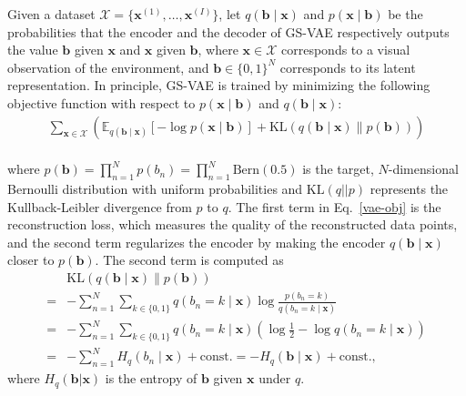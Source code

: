 Given a dataset $\mathcal{X}=\{\mathbf{x}^{(1)},\dots,\mathbf{x}^{(I)}\}$,
let $q(\mathbf{b} \mid \mathbf{x})$ and $p(\mathbf{x} \mid \mathbf{b})$ be the probabilities that the encoder and the decoder of GS-VAE respectively outputs the value $\mathbf{b}$ given $\mathbf{x}$ and $\mathbf{x}$ given $\mathbf{b}$,
where $\mathbf{x}\in \mathcal{X}$ corresponds to a visual observation of the environment, and $\mathbf{b}\in\{0,1\}^N$ corresponds to its latent representation.
In principle, GS-VAE is trained by minimizing the following objective function with respect to $p(\mathbf{x} \mid \mathbf{b})$ and $q(\mathbf{b}\mid \mathbf{x})$:
{
\begin{align}
\label{vae-obj} \sum_{\mathbf{x}\in \mathcal{X}} \left(\mathbb{E}_{q(\mathbf{b}\mid \mathbf{x})}\left[-\log p(\mathbf{x}\mid \mathbf{b})\right] + \mathrm{KL}(q(\mathbf{b}\mid \mathbf{x}) \parallel p(\mathbf{b}))\right)
\end{align}
}
\\\noindent where $p(\mathbf{b}) = \prod_{n=1}^N p(b_n) = \prod_{n=1}^N \mathrm{Bern}(0.5)$ is the target, $N$-dimensional Bernoulli distribution with uniform probabilities
and $\mathrm{KL}(q || p)$ represents the Kullback-Leibler divergence from $p$ to $q$.
The first term in Eq.~\eqref{vae-obj} is the reconstruction loss, which measures the quality of the reconstructed data points,
and the second term regularizes the encoder by making the encoder $q(\mathbf{b}\mid \mathbf{x})$ closer to $p(\mathbf{b})$.
The second term is computed as
{
\begin{align*}
 &{\mathrm{KL}}(q(\mathbf{b}\mid \mathbf{x}) \parallel p(\mathbf{b})) \\
= & - \sum_{n=1}^N \sum_{k\in\{0,1\}}q(b_{n}=k \mid \mathbf{x}) \log\frac{p(b_{n}=k)}{q(b_{n}=k \mid \mathbf{x})}\\
=& - \sum_{n=1}^N \sum_{k\in\{0,1\}}q(b_{n}=k \mid \mathbf{x}) \left(\log \frac{1}{2} - \log{q(b_{n}=k \mid \mathbf{x})}\right)\\
=& - \sum_{n=1}^N H_q(b_n\mid \mathbf{x}) + \mathrm{const.} = -H_q(\mathbf{b} \mid \mathbf{x}) + \mathrm{const.},
\end{align*}
}
where $H_q(\mathbf{b}|\mathbf{x})$ is the entropy of $\mathbf{b}$ given $\mathbf{x}$ under $q$.

